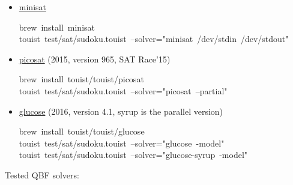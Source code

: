 \begin{itemize}%

\item{}
\href{http://minisat.se}{minisat}%
\begin{mdpre}%
\noindent brew~install~minisat\\
touist~test/sat/sudoku.touist~--solver="minisat~/dev/stdin~/dev/stdout"%
\end{mdpre}%

\item{}
\href{http://fmv.jku.at/picosat}{picosat} (2015, version 965, SAT Race'15)%
\begin{mdpre}%
\noindent brew~install~touist/touist/picosat\\
touist~test/sat/sudoku.touist~--solver="picosat~--partial"%
\end{mdpre}%

\item{}
\href{https://www.labri.fr/perso/lsimon/glucose}{glucose} (2016, version 4.1, syrup is the parallel version)%
\begin{mdpre}%
\noindent brew~install~touist/touist/glucose\\
touist~test/sat/sudoku.touist~--solver="glucose~-model"\\
touist~test/sat/sudoku.touist~--solver="glucose-syrup~-model"%
\end{mdpre}%
\end{itemize}%

\noindent Tested QBF solvers:%

